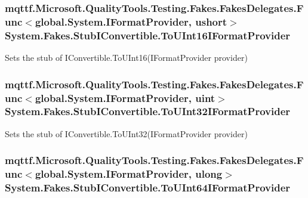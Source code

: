 \hypertarget{class_system_1_1_fakes_1_1_stub_i_convertible_a734392d60fc71f14fcc20e4a3c9e9be7}{
\subsubsection[{To\-U\-Int16\-I\-Format\-Provider}]{\setlength{\rightskip}{0pt plus 5cm}mqttf.\-Microsoft.\-Quality\-Tools.\-Testing.\-Fakes.\-Fakes\-Delegates.\-Func$<$global.\-System.\-I\-Format\-Provider, ushort$>$ System.\-Fakes.\-Stub\-I\-Convertible.\-To\-U\-Int16\-I\-Format\-Provider}}\label{class_system_1_1_fakes_1_1_stub_i_convertible_a734392d60fc71f14fcc20e4a3c9e9be7}


Sets the stub of I\-Convertible.\-To\-U\-Int16(\-I\-Format\-Provider provider)

\hypertarget{class_system_1_1_fakes_1_1_stub_i_convertible_a6034310c9c61c066262fd366c0e00545}{
\subsubsection[{To\-U\-Int32\-I\-Format\-Provider}]{\setlength{\rightskip}{0pt plus 5cm}mqttf.\-Microsoft.\-Quality\-Tools.\-Testing.\-Fakes.\-Fakes\-Delegates.\-Func$<$global.\-System.\-I\-Format\-Provider, uint$>$ System.\-Fakes.\-Stub\-I\-Convertible.\-To\-U\-Int32\-I\-Format\-Provider}}\label{class_system_1_1_fakes_1_1_stub_i_convertible_a6034310c9c61c066262fd366c0e00545}


Sets the stub of I\-Convertible.\-To\-U\-Int32(\-I\-Format\-Provider provider)

\hypertarget{class_system_1_1_fakes_1_1_stub_i_convertible_a99c2b760e7c22b50d78c8d85f2563fe7}{
\subsubsection[{To\-U\-Int64\-I\-Format\-Provider}]{\setlength{\rightskip}{0pt plus 5cm}mqttf.\-Microsoft.\-Quality\-Tools.\-Testing.\-Fakes.\-Fakes\-Delegates.\-Func$<$global.\-System.\-I\-Format\-Provider, ulong$>$ System.\-Fakes.\-Stub\-I\-Convertible.\-To\-U\-Int64\-I\-Format\-Provider}}\label{class_system_1_1_fakes_1_1_stub_i_convertible_a99c2b760e7c22b50d78c8d85f2563fe7}


